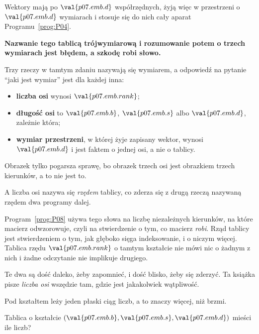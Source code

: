 \begin{fr}
Wektory mają po $\val{p07.emb.d}$ współrzędnych, żyją więc w przestrzeni o
$\val{p07.emb.d}$ wymiarach i stosuje się do nich cały aparat
Programu~\ref{prog:P04}.

\begin{trapbox}
\textbf{Nazwanie tego tablicą trójwymiarową i rozumowanie potem o trzech
wymiarach jest błędem, a szkodę robi słowo.}

Trzy rzeczy w tamtym zdaniu nazywają się wymiarem, a odpowiedź na pytanie
\enquote{jaki jest wymiar} jest dla każdej inna:

\begin{itemize}
\item \textbf{liczba osi} wynosi $\val{p07.emb.rank}$;
\item \textbf{długość osi} to $\val{p07.emb.b}$,
  $\val{p07.emb.s}$ albo $\val{p07.emb.d}$, zależnie która;
\item \textbf{wymiar przestrzeni}, w której żyje zapisany wektor, wynosi
  $\val{p07.emb.d}$ i jest faktem o jednej osi, a nie o tablicy.
\end{itemize}

Obrazek tylko pogarsza sprawę, bo obrazek trzech osi jest obrazkiem trzech
kierunków, a to nie jest to.
\end{trapbox}
\end{fr}

\begin{fr}
\begin{note}
A liczba osi nazywa się \emph{rzędem} tablicy, co zderza się z drugą rzeczą
nazywaną rzędem dwa programy dalej.

Program~\ref{prog:P08} używa tego słowa na liczbę niezależnych kierunków, na
które macierz odwzorowuje, czyli na stwierdzenie o tym, co macierz
\emph{robi}. Rząd tablicy jest stwierdzeniem o tym, jak głęboko sięga
indeksowanie, i o niczym więcej. Tablica rzędu $\val{p07.emb.rank}$ o tamtym
kształcie nie mówi nic o żadnym z nich i żadne odczytanie nie implikuje
drugiego.

Te dwa są dość daleko, żeby zapomnieć, i dość blisko, żeby się zderzyć. Ta
książka pisze \emph{liczba osi} wszędzie tam, gdzie jest jakakolwiek
wątpliwość.
\end{note}
\end{fr}

\begin{fr}
Pod kształtem leży jeden płaski ciąg liczb, a to znaczy więcej, niż brzmi.

Tablica o kształcie $(\val{p07.emb.b}, \val{p07.emb.s}, \val{p07.emb.d})$
mieści ile liczb?
\dotline
\nextframe
\end{fr}

